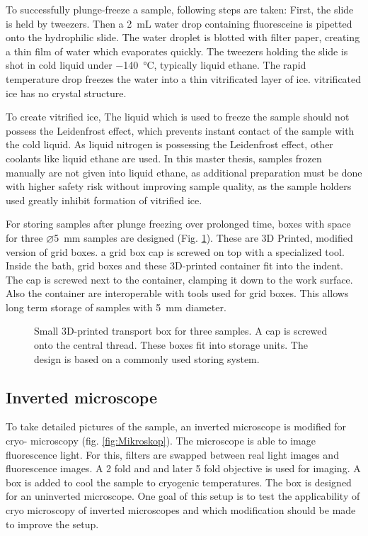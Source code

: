 To successfully plunge-freeze a sample, following steps are taken: First, the slide is held by tweezers. Then a \SI{2}{\milli\liter} water drop containing fluoresceine is pipetted onto the hydrophilic slide. The water droplet is blotted with filter paper, creating a thin film of water which evaporates quickly. The tweezers holding the slide is shot in cold liquid under \SI{-140}{\degreeCelsius}, typically liquid ethane. The rapid temperature drop freezes the water into a thin vitrificated layer of ice. vitrificated ice has no crystal structure.

To create vitrified ice, The liquid which is used to freeze the sample should not possess the Leidenfrost effect, which prevents instant contact of the sample with the cold liquid. As liquid nitrogen is possessing the Leidenfrost effect, other coolants like liquid ethane are used. In this master thesis, samples frozen manually are not given into liquid ethane, as additional preparation must be done with higher safety risk without improving sample quality, as the sample holders used greatly inhibit formation of vitrified ice.

For storing samples after plunge freezing over prolonged time, boxes with space for three $\varnothing$\SI{5}{\milli\meter} samples are designed (Fig. \ref{fig:transportbox}). These are 3D Printed, modified version of grid boxes. a grid box cap is screwed on top with a specialized tool. Inside the bath, grid boxes and these 3D-printed container fit into the indent. The cap is screwed next to the container, clamping it down to the work surface. Also the container are interoperable with tools used for grid boxes. This allows long term storage of samples with \SI{5}{\milli\meter} diameter.

\begin{figure}
	\centering
	
	\caption{Small 3D-printed transport box for three samples. A cap is screwed onto the central thread. These boxes fit into storage units. The design is based on a commonly used storing system.\newline\newline}
	\label{fig:transportbox}
\end{figure}

\subsection{Inverted microscope}

To take detailed pictures of the sample, an inverted microscope is modified for cryo- microscopy (fig. \ref{fig:Mikroskop}). The microscope is able to image fluorescence light. For this, filters are swapped between real light images and fluorescence images. A 2 fold and and later 5 fold objective is used for imaging. A box is added to cool the sample to cryogenic temperatures. The box is designed for an uninverted microscope. One goal of this setup is to test the applicability of cryo microscopy of inverted microscopes and which modification should be made to improve the setup.

